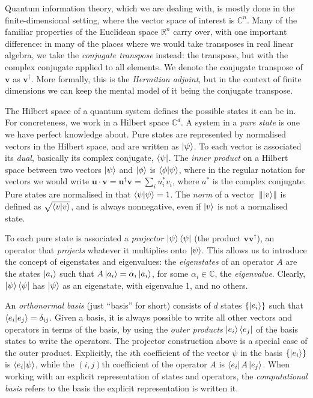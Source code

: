 \documentclass[10pt, a4paper]{article}
\numberwithin{equation}{section} %
\theoremstyle{definition}
\theoremstyle{plain}
\newcommand{\norm}[1]{\mathop{}\left\lVert#1\right\rVert}
\newcommand{\?}{\mathrel{?}} %
\newcommand{\R}{\mathbb{R}} %
\newcommand{\C}{\mathbb{C}} %
\newcommand{\cvec}[1]{\boldsymbol{\mathbf{#1}}}    %
\begin{document}
\begin{appendices}
                    Quantum information theory, which we are dealing with, is mostly done in the finite-dimensional setting, where the vector space of interest is \(\C^n\). Many of the familiar properties of the Euclidean space \(\R^n\) carry over, with one important difference: in many of the places where we would take transposes in real linear algebra, we take the \emph{conjugate transpose} instead: the transpose, but with the complex conjugate applied to all elements. We denote the conjugate transpose of \(\cvec{v}\) as \(\cvec{v}^{\dagger}\). More formally, this is the \emph{Hermitian adjoint}, but in the context of finite dimensions we can keep the mental model of it being the conjugate transpose.

                    The Hilbert space of a quantum system defines the possible states it can be in. For concreteness, we work in a Hilbert space \(\C^d\). A system in a \emph{pure state} is one we have perfect knowledge about. Pure states are represented by normalised vectors in the Hilbert space, and are written as \(\ket{\psi}\). To each vector is associated its \emph{dual}, basically its complex conjugate, \(\bra{\psi}\). The \emph{inner product} on a Hilbert space between two vectors \(\ket{\psi}\) and \(\ket{\phi}\) is \(\braket{\phi|\psi}\), where in the regular notation for vectors we would write \(\cvec{u} \cdot \cvec{v} = \cvec{u}^{\dagger}\cvec{v} = \sum_i u^*_i v_i\), where \(a^*\) is the complex conjugate. Pure states are normalised in that \(\braket{\psi|\psi}  = 1\). The \emph{norm} of a vector \(\norm{\ket{v}}\) is defined as \(\sqrt{\braket{v|v}}\), and is always nonnegative, even if \(\ket{v}\) is not a normalised state.

                    To each pure state is associated a \emph{projector} \(\ket{\psi}\bra{\psi}\) (the product \(\cvec{v}\cvec{v}^{\dagger}\)), an operator that \emph{projects} whatever it multiplies onto \(\ket{\psi}\). This allows us to introduce the concept of eigenstates and eigenvalues: the \emph{eigenstates} of an operator \(A\) are the states \(\ket{a_i}\) such that \(A\ket{a_i} = \alpha_i\ket{a_i}\), for some \(\alpha_i \in \C\), the \emph{eigenvalue}. Clearly, \(\ket{\psi}\bra{\psi}\) has \(\ket{\psi}\) as an eigenstate, with eigenvalue 1, and no others.

                    An \emph{orthonormal basis} (just ``basis'' for short) consists of \(d\) states \(\{\ket{e_i}\}\) such that \(\braket{e_i|e_j} = \delta_{ij}\). Given a basis, it is always possible to write all other vectors and operators in terms of the basis, by using the \emph{outer products} \(\ket{e_i}\bra{e_j}\) of the basis states to write the operators. The projector construction above is a special case of the outer product. Explicitly, the \(i\)th coefficient of the vector \(\psi\) in the basis \(\{\ket{e_i}\}\) is \(\braket{e_i|\psi}\), while the \((i,j)\)th coefficient of the operator \(A\) is \(\bra{e_i}A\ket{e_j}\). When working with an explicit representation of states and operators, the \emph{computational basis} refers to the basis the explicit representation is written it.


\end{appendices}
\end{document}
